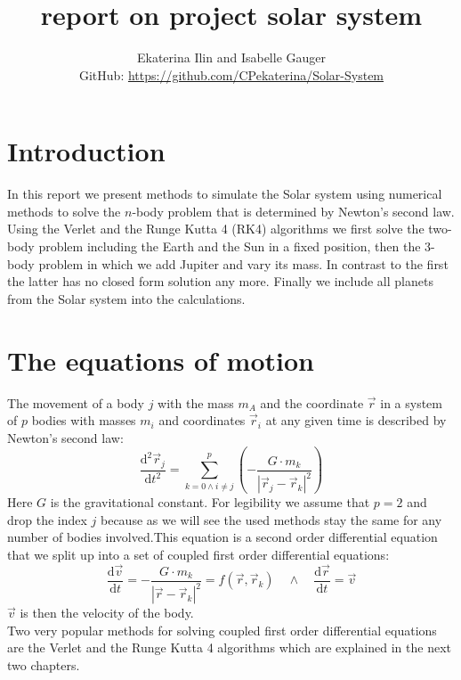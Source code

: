 \documentclass[11pt,a4wide]{article}
\begin{document}
\title{report on project solar system}
\author{Ekaterina Ilin and Isabelle Gauger\\GitHub: \url{https://github.com/CPekaterina/Solar-System}
}
\maketitle
\tableofcontents
\newpage
\section{Introduction}
In this report we present methods to simulate the Solar system using numerical methods to solve the $n$-body problem that is determined by Newton's second law.  Using the Verlet and the Runge Kutta 4 (RK4) algorithms we first solve the two-body problem including the Earth and the Sun in a fixed position, then the 3-body problem in which we add Jupiter and vary its mass. In contrast to the first the latter has no closed form solution any more. Finally we include all planets from the Solar system into the calculations.
\section{The equations of motion}
The movement of a body $j$ with the mass $m_A$ and the coordinate $\vec{r}$ in a system of $p$ bodies with masses $m_i$  and coordinates $\vec{r}_i$ at any given time is described by Newton's second law:
\begin{equation}
\dfrac{\mathrm d^2 \vec{r}_j}{\mathrm d t^2}=\displaystyle\sum_{k=0 \wedge i\neq j}^{p}\left(-\dfrac{G\cdot m_k}{\left|\vec{r}_j-\vec{r}_k\right|^2}\right)
\label{eq:Newton}
\end{equation}
Here $G$ is the gravitational constant.  For legibility we assume that $p=2$  and drop the index $j$ because as we will see the used methods stay the same for any number of bodies involved.This equation is a second order differential equation that we split up into a set of coupled first order differential equations:
\begin{equation}
\dfrac{\mathrm d\vec{v}}{\mathrm d t}=-\dfrac{G\cdot m_k}{\left|\vec{r}-\vec{r}_k\right|^2}=f(\vec{r},\vec{r}_k)\quad\wedge\quad \dfrac{\mathrm d\vec{r}}{\mathrm d t}=\vec{v}
\label{eq:cNewton}
\end{equation}
$\vec{v}$ is then the velocity of the body. 
\\
Two very popular methods for solving coupled first order differential equations are the Verlet and the Runge Kutta 4 algorithms which are explained in the next two chapters.
\end{document}

